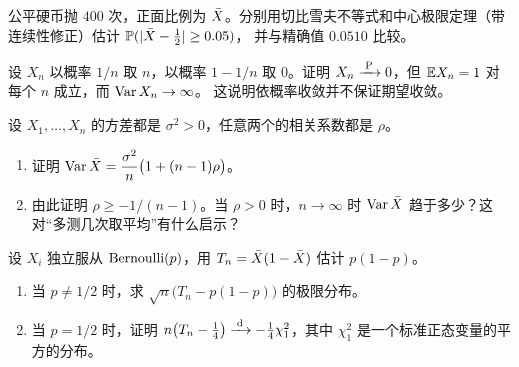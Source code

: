 \begin{exercise}
公平硬币抛 $400$ 次，正面比例为 $\bar{X}$。分别用切比雪夫不等式和中心极限定理（带连续性修正）估计 $\mathbb{P}(|\bar{X}-\tfrac12|\ge0.05)$，
并与精确值 $0.0510$ 比较。
\end{exercise}

\levelB
\begin{exercise}\label{ex0:moments}
设 $X_n$ 以概率 $1/n$ 取 $n$，以概率 $1-1/n$ 取 $0$。证明 $X_n\xrightarrow{\;\mathrm{P}\;}0$，但 $\mathbb{E} X_n=1$ 对每个 $n$ 成立，而 $\operatorname{Var} X_n\to\infty$。
这说明依概率收敛并不保证期望收敛。
\end{exercise}

\begin{exercise}\label{ex0:equicorr}
设 $X_1,\dots,X_n$ 的方差都是 $\sigma^2>0$，任意两个的相关系数都是 $\rho$。
\begin{enumerate}
\item 证明 $\operatorname{Var}\bar{X}=\dfrac{\sigma^2}{n}\big(1+(n-1)\rho\big)$。
\item 由此证明 $\rho\ge-1/(n-1)$。当 $\rho>0$ 时，$n\to\infty$ 时 $\operatorname{Var}\bar{X}$ 趋于多少？这对“多测几次取平均”有什么启示？
\end{enumerate}
\end{exercise}

\begin{exercise}\label{ex0:deltazero}
设 $X_i$ 独立服从 $\operatorname{Bernoulli}(p)$，用 $T_n=\bar{X}(1-\bar{X})$ 估计 $p(1-p)$。
\begin{enumerate}
\item 当 $p\ne1/2$ 时，求 $\sqrt n\big(T_n-p(1-p)\big)$ 的极限分布。
\item 当 $p=1/2$ 时，证明 $n\big(T_n-\tfrac14\big)\xrightarrow{\;\mathrm{d}\;}-\tfrac14\chi^2_1$，其中 $\chi^2_1$ 是一个标准正态变量的平方的分布。
\end{enumerate}
\end{exercise}
